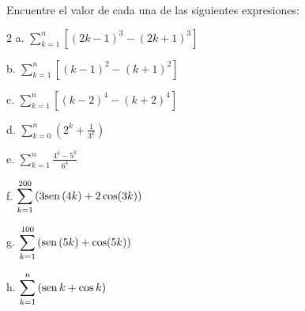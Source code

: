 \clearpage
\begin{ejer}{Encuentre el valor de cada una de las siguientes expresiones:}
{\small
\begin{multicols}{2}
a. $\displaystyle\sum_{k=1}^{n}\left[ \left( 2k-1\right) ^{3}-\left( 2k+1\right) ^{3}\right]$


b. $\displaystyle\sum_{k=1}^{n}\left[ \left( k-1\right) ^{2}-\left( k+1\right) ^{2}\right]$


c. $\displaystyle\sum_{k=1}^{n}\left[ \left( k-2\right) ^{4}-\left( k+2\right) ^{4}\right]$


d. $\displaystyle\sum_{k=0}^{n}\left( 2^{k}+\frac{1}{3^{k}}\right)$


e. $\displaystyle\sum_{k=1}^{n}\frac{4^{k}-5^{k}}{6^{k}}$


f. $\displaystyle\sum_{k=1}^{200}\left( 3\text{\rm sen}\,(4k)+2\cos(3k)\right)$


g. $\displaystyle\sum_{k=1}^{100}\left( \text{\rm sen}\,(5k)+\cos(5k) \right)$


h. $\displaystyle\sum_{k=1}^{n}\left( \text{\rm sen}\, k+\cos k \right)$
\end{multicols}
}
\end{ejer}






